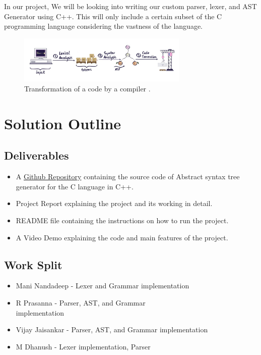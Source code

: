 \documentclass[journal,12pt]{IEEEtran}
\begin{document}
In our project, We will be looking into writing our custom parser, lexer, and AST Generator using C++. This will only include a certain subset of the C programming language considering the vastness of the language. 

\begin{figure}[htbp]
        \centerline{\includegraphics[width=230pt]{ast.jpeg}}
        \caption{ Transformation of a code by a compiler \cite{kundel_2020}. \\}
        \label{fig}
    \end{figure}


\vspace{15pt}

\section{Solution Outline}

\subsection{Deliverables}
\begin{itemize}
    \item A \href{https://github.com/vijay-jaisankar/aster}{Github Repository} containing the source code of Abstract syntax tree generator for the C language in C++.
    \item Project Report explaining the project and its working in detail. 
    \item README file containing the instructions on how to run the project.
    \item A Video Demo explaining the code and main features of the project.
\end{itemize}


\subsection{Work Split}
\begin{itemize}
    \item Mani Nandadeep -  Lexer and Grammar implementation
    \item R Prasanna - Parser, AST, and Grammar \\ implementation 
    \item Vijay Jaisankar - Parser, AST, and Grammar implementation
    \item M Dhanush - Lexer implementation, Parser
\end{itemize}
\end{document}
